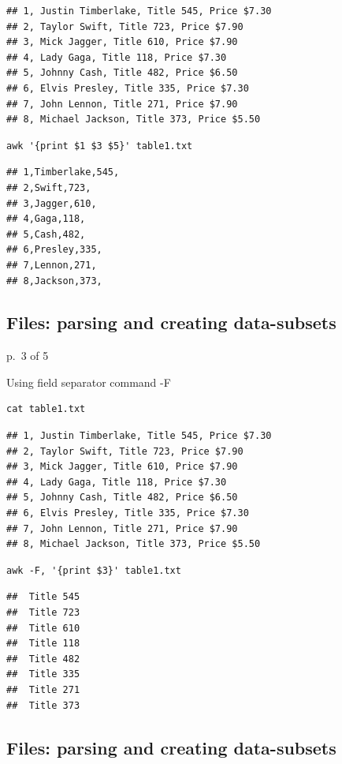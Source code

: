 \documentclass[
]{book}
\begin{document}
\begin{verbatim}
## 1, Justin Timberlake, Title 545, Price $7.30
## 2, Taylor Swift, Title 723, Price $7.90
## 3, Mick Jagger, Title 610, Price $7.90
## 4, Lady Gaga, Title 118, Price $7.30
## 5, Johnny Cash, Title 482, Price $6.50
## 6, Elvis Presley, Title 335, Price $7.30
## 7, John Lennon, Title 271, Price $7.90
## 8, Michael Jackson, Title 373, Price $5.50
\end{verbatim}

\begin{verbatim}
awk '{print $1 $3 $5}' table1.txt
\end{verbatim}

\begin{verbatim}
## 1,Timberlake,545,
## 2,Swift,723,
## 3,Jagger,610,
## 4,Gaga,118,
## 5,Cash,482,
## 6,Presley,335,
## 7,Lennon,271,
## 8,Jackson,373,
\end{verbatim}

\hypertarget{files-parsing-and-creating-data-subsets-2}{%
\subsection{Files: parsing and creating data-subsets}\label{files-parsing-and-creating-data-subsets-2}}

p.~3 of 5

Using field separator command -F

\begin{verbatim}
cat table1.txt
\end{verbatim}

\begin{verbatim}
## 1, Justin Timberlake, Title 545, Price $7.30
## 2, Taylor Swift, Title 723, Price $7.90
## 3, Mick Jagger, Title 610, Price $7.90
## 4, Lady Gaga, Title 118, Price $7.30
## 5, Johnny Cash, Title 482, Price $6.50
## 6, Elvis Presley, Title 335, Price $7.30
## 7, John Lennon, Title 271, Price $7.90
## 8, Michael Jackson, Title 373, Price $5.50
\end{verbatim}

\begin{verbatim}
awk -F, '{print $3}' table1.txt
\end{verbatim}

\begin{verbatim}
##  Title 545
##  Title 723
##  Title 610
##  Title 118
##  Title 482
##  Title 335
##  Title 271
##  Title 373
\end{verbatim}

\hypertarget{files-parsing-and-creating-data-subsets-3}{%
\subsection{Files: parsing and creating data-subsets}\label{files-parsing-and-creating-data-subsets-3}}
\end{document}
